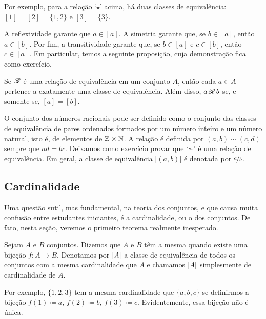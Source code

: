 Por exemplo, para a relação `$\star$' acima, há duas classes de equivalência:
$[1] = [2] = \{ 1,2 \}$ e $[3] = \{ 3 \}$.

A reflexividade garante que $a \in [a]$. A simetria garante que, se
$b \in [a]$, então $a \in [b]$. Por fim, a transitividade garante que,
se $b \in [a]$ e $c \in [b]$, então $c \in [a]$.
Em particular, temos a seguinte proposição, cuja demonstração fica como
exercício.

\begin{prop} \label{prop:equivclasses}
Se ${\mathscr{R}}$ é uma relação de equivalência em um conjunto $A$,
então cada $a \in A$ pertence a exatamente uma classe de equivalência.
Além disso, $a\, {\mathscr{R}} \, b$ se, e somente se, $[a] = [b]$.
\end{prop}

\begin{example} \label{example:ratnums}
O conjunto dos números racionais pode ser definido como o conjunto das
classes de equivalência de pares ordenados formados por um número inteiro e
um número natural, isto é, de elementos de ${\mathbb{Z}} \times {\mathbb{N}}$. A relação é definida por
$(a,b) \sim (c,d)$ sempre que $ad = bc$.
Deixamos como exercício provar que `$\sim$' é uma relação de equivalência.
Em geral, a classe de equivalência $\bigl[(a,b)\bigr]$ é denotada por
$\nicefrac{a}{b}$.
\end{example}

\subsection{Cardinalidade}

Uma questão sutil, mas fundamental, na teoria dos conjuntos, e que causa
muita confusão entre estudantes iniciantes, é a cardinalidade, ou o
 dos conjuntos.
De fato, nesta seção, veremos o primeiro teorema realmente inesperado.

\begin{defn}
Sejam $A$ e $B$ conjuntos. Dizemos que $A$ e $B$ têm a mesma
\emph{}
quando existe uma bijeção $f \colon A \to B$. Denotamos
por $\lvert {A} \rvert$  a classe de equivalência de todos os
conjuntos com a mesma cardinalidade que $A$ e chamamos $\lvert {A} \rvert$ simplesmente
de cardinalidade de $A$.
\end{defn}

Por exemplo, $\{ 1,2,3 \}$ tem a mesma cardinalidade que $\{ a,b,c \}$ se
definirmos a bijeção $f(1) \coloneqq a$, $f(2) \coloneqq b$,
$f(3) \coloneqq c$.
Evidentemente, essa bijeção não é única.

